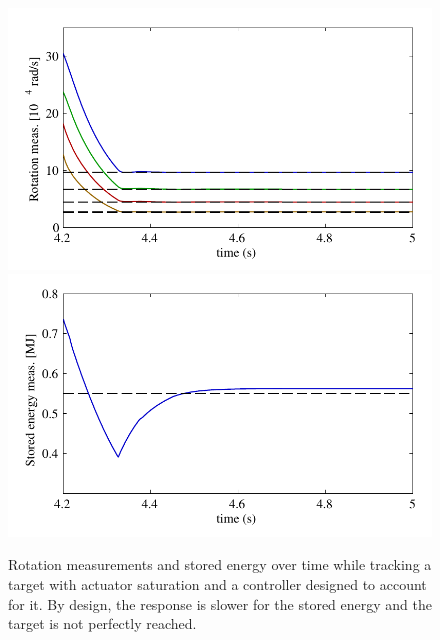 \documentclass[12pt,lot, lof]{puthesis}
\begin{document}
\begin{figure}[htbp]
	\centering
	\includegraphics{chap10/good_y_sat_rotation}
	\includegraphics{chap10/good_y_sat_energy}
	\caption{Rotation measurements and stored energy over time while tracking a target with actuator saturation and a controller designed to account for it.
		By design, the response is slower for the stored energy and the target is not perfectly reached.}
	\label{fig:good_y_sat}
\end{figure}
\end{document}
